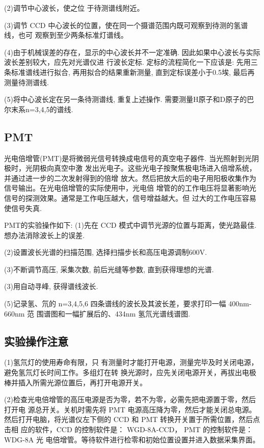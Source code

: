 \documentclass[12pt,a4paper]{article}
\begin{document}
(2)调节中心波长，使之位
于待测谱线附近。

(3)调节 CCD 中心波长的位置，使在同一个摄谱范围内既可观察到待测的氢谱线，也可
观察到至少两条标准灯谱线。

(4)由于机械误差的存在，显示的中心波长并不一定准确. 因此如果中心波长与实际波长差别较大，应先对光谱仪进
行波长定标. 定标的流程简化一下应该是: 先用三条标准谱线进行拟合, 再用拟合的结果重新测量, 直到定标误差小于0.5埃, 最后再测量待测谱线. 

(5)将中心波长定在另一条待测谱线, 重复上述操作.  需要测量H原子和D原子的巴尔末系n=3,4,5的谱线. 

\subsection{PMT}
光电倍增管(PMT)是将微弱光信号转换成电信号的真空电子器件. 当光照射到光阴极时，光阴极向真空中激
发出光电子。这些光电子按聚焦极电场进入倍增系统，并通过进一步的二次发射得到的倍增
放大。然后把放大后的电子用阳极收集作为信号输出。在光电倍增管的实际使用中，光电倍
增管的的工作电压将显著影响光信号的探测效果。通常是工作电压越大，信号增益越大。但
过大的工作电压容易使信号失真. 

PMT的实验操作如下: 
(1)先在 CCD 模式中调节光源的位置与距离，使光路最佳. 想办法消除波长上的误差. 

(2)设置波长光谱的扫描范围, 选择扫描步长和高压电源调制600V. 

(3)不断调节高压, 采集次数, 前后光缝等参数, 直到获得理想的光谱. 

(3)用自动寻峰, 获得谱线波长. 

(5)记录氢、氘的 n=3,4,5,6 四条谱线的波长及其波长差，要求打印一幅 400nm-660nm 范
围谱图和一幅扩展后的、434nm 氢氘光谱线谱图.

\subsection{实验操作注意}
(1)氢氘灯的使用寿命有限，只
有测量时才能打开电源，测量完毕及时关闭电源，避免氢氘灯长时间工作。多组灯在转
换光源时，应先关闭电源开关，再拔出电极棒并插入所需光源位置后，再打开电源开关。

(2)检查光电倍增管的高压电源是否为零，若不为零，必需先把电源置于零，然后打开电
源总开关。关机时需先将 PMT 电源高压降为零，然后才能关闭总电源。
然后打开电脑，将光谱仪左下侧的 CCD 和 PMT 转换开关置于所需位置，然后点击相
应的软件，CCD 的控制软件是： WGD-8A-CCD， PMT 的控制软件是：WDG-8A 光
电倍增管。等待软件进行检零和初始位置设置并进入数据采集界面。
\end{document}
